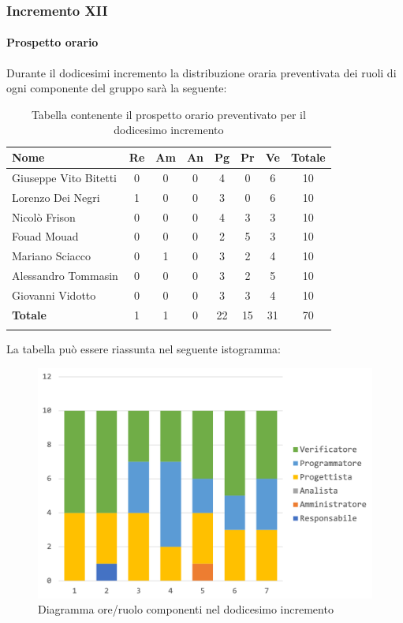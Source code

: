 		
	\subsubsection{Incremento XII}
		\paragraph{Prospetto orario}
		Durante il dodicesimi incremento la distribuzione oraria preventivata dei ruoli di ogni componente del gruppo sarà la seguente:
		
		\begin{longtable}{|l|c|c|c|c|c|c|c|}
			\hline
			\rowcolor{lighter-grayer}
			\textbf{Nome} & \textbf{Re} & \textbf{Am} & \textbf{An} & \textbf{Pg}  & \textbf{Pr}   & \textbf{Ve} & \textbf{Totale} \\
			\hline
			\endfirsthead
			
			\hline
			Giuseppe Vito Bitetti 		 & 0 & 0 & 0 & 4 & 0 & 6 & 10\\
			\hline
			\hline
			Lorenzo Dei Negri			 & 1 & 0 & 0 & 3 & 0 & 6 & 10\\
			\hline
			\hline
			Nicolò Frison				      & 0 & 0 & 0 & 4 & 3 & 3 & 10\\
			\hline
			\hline
			Fouad Mouad 				   & 0 & 0 & 0 & 2 & 5 & 3 & 10\\
			\hline
			\hline
			Mariano Sciacco 			 & 0 & 1 & 0 & 3 & 2 & 4 & 10\\
			\hline
			\hline
			Alessandro Tommasin    & 0 & 0 & 0 & 3 & 2 & 5 & 10\\
			\hline
			\hline
			Giovanni Vidotto 			  & 0 & 0 & 0 & 3 & 3 & 4 & 10\\
			\hline 
			\textbf{Totale}			 		& 1 & 1 & 0 & 22 & 15 & 31 & 70\\
			\hline
			\caption{Tabella contenente il prospetto orario preventivato per il dodicesimo incremento}
		\end{longtable}
		
		La tabella può essere riassunta nel seguente istogramma:
		\begin{figure}[H]
			\centering
			\includegraphics[width=0.8\linewidth]{./images/preventivo/incremento12-1.png}
			\caption{Diagramma ore/ruolo componenti nel dodicesimo incremento}
			\label{fig:diagramma suddivione ruoli incremento XII}
		\end{figure}
		\pagebreak
		
